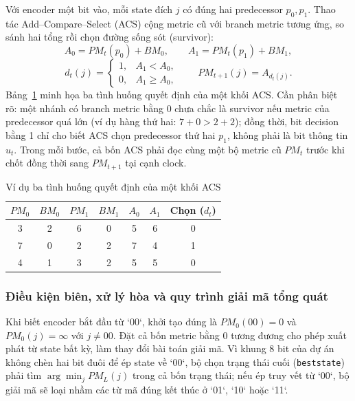 \documentclass[12pt,a4paper]{article}
\DeclareRobustCommand{\code}[1]{\texttt{#1}}
\renewcommand{\_}{\originalunderscore\allowbreak}
\begin{document}
Với encoder một bit vào, mỗi state đích $j$ có đúng hai predecessor $p_0, p_1$. Thao tác Add--Compare--Select (ACS) cộng metric cũ với branch metric tương ứng, so sánh hai tổng rồi chọn đường sống sót (survivor):
\begin{equation}
A_0=PM_t(p_0)+BM_0,\qquad A_1=PM_t(p_1)+BM_1,
\end{equation}
\begin{equation}
d_t(j)=\begin{cases}1,&A_1<A_0,\\0,&A_1\ge A_0,\end{cases}
\qquad PM_{t+1}(j)=A_{d_t(j)}.
\end{equation}
Bảng~\ref{tab:theory-acs3} minh họa ba tình huống quyết định của một khối ACS. Cần phân biệt rõ: một nhánh có branch metric bằng 0 chưa chắc là survivor nếu metric của predecessor quá lớn (ví dụ hàng thứ hai: $7+0 > 2+2$); đồng thời, bit decision bằng 1 chỉ cho biết ACS chọn predecessor thứ hai $p_1$, không phải là bit thông tin $u_t$. Trong mỗi bước, cả bốn ACS phải đọc cùng một bộ metric cũ $PM_t$ trước khi chốt đồng thời sang $PM_{t+1}$ tại cạnh clock.

\begin{table}[H]\centering\small
\begin{tabular}{ccccccc}\toprule
\textbf{$PM_0$}&\textbf{$BM_0$}&\textbf{$PM_1$}&\textbf{$BM_1$}&\textbf{$A_0$}&\textbf{$A_1$}&\textbf{Chọn ($d_t$)}\\\midrule
3&2&6&0&5&6&0\\7&0&2&2&7&4&1\\4&1&3&2&5&5&0\\\bottomrule
\end{tabular}
\caption{Ví dụ ba tình huống quyết định của một khối ACS}\label{tab:theory-acs3}
\end{table}

\subsubsection{Điều kiện biên, xử lý hòa và quy trình giải mã tổng quát}
Khi biết encoder bắt đầu từ `00`, khởi tạo đúng là $PM_0(00)=0$ và $PM_0(j)=\infty$ với $j\ne 00$. Đặt cả bốn metric bằng 0 tương đương cho phép xuất phát từ state bất kỳ, làm thay đổi bài toán giải mã. Vì khung 8 bit của dự án không chèn hai bit đuôi để ép state về `00`, bộ chọn trạng thái cuối (\code{best\_state}) phải tìm $\arg\min_j PM_L(j)$ trong cả bốn trạng thái; nếu ép truy vết từ `00`, bộ giải mã sẽ loại nhầm các từ mã đúng kết thúc ở `01`, `10` hoặc `11`.
\end{document}
